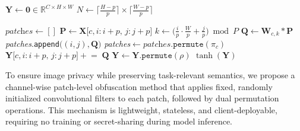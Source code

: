 \documentclass{ieeeaccess}
\begin{document}
\begin{algorithm}[t]
\caption{Channel-wise Patch-level Obfuscation with Conv2D and Dual Permutations}
\label{alg:obfuscator}
\begin{algorithmic}[1]
  

\STATE $\mathbf{Y}\gets\mathbf{0}\in\mathbb{R}^{C \times H \times W}$
\STATE $N \gets \bigl\lceil\frac{H-p}{p}\bigr\rceil \times \bigl\lceil\frac{W-p}{p}\bigr\rceil$ 

    \STATE $\textit{patches} \gets []$
            \STATE $\mathbf{P}\!\leftarrow\!\mathbf{X}\bigl[c,i{:}i{+}p,\,j{:}j{+}p\bigr]$
            \STATE $k \gets \bigl(\tfrac{i}{p}\cdot\tfrac{W}{p}+\tfrac{j}{p}\bigr)\bmod P$  
            \STATE $\mathbf{Q}\!\leftarrow\!\mathbf{W}_{c,k}\ast\mathbf{P}$
            \STATE \textit{patches}.\texttt{append}$\bigl((i,j),\mathbf{Q}\bigr)$
        \ENDFOR
    \ENDFOR
    \STATE \textit{patches}$\leftarrow \textit{patches}.\texttt{permute}(\pi_c)$                
        \STATE $\mathbf{Y}\bigl[c,i{:}i{+}p,\,j{:}j{+}p\bigr] \mathrel{+}{=}\; \mathbf{Q}$
    \ENDFOR
\ENDFOR
\STATE $\mathbf{Y}\gets \mathbf{Y}.\texttt{permute}(\rho)$
\STATE \RETURN $\tanh(\mathbf{Y})$
\end{algorithmic}
\end{algorithm}

To ensure image privacy while preserving task-relevant semantics, we propose a channel-wise patch-level obfuscation method that applies fixed, randomly initialized convolutional filters to each patch, followed by dual permutation operations. This mechanism is lightweight, stateless, and client-deployable, requiring no training or secret-sharing during model inference.
\end{document}

